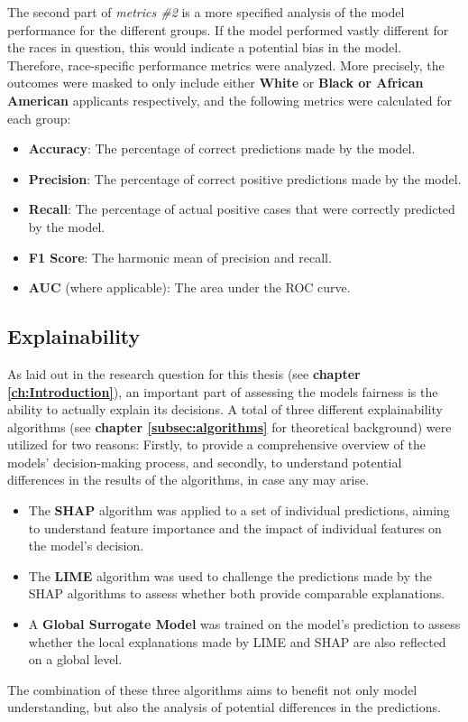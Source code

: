 The second part of \textit{metrics \#2} is a more specified analysis of the model performance for the different groups. If the model performed vastly different for the races in question, this would indicate a potential bias in the model. Therefore, race-specific performance metrics were analyzed.
More precisely, the outcomes were masked to only include either \textbf{White} or \textbf{Black or African American} applicants respectively, and the following metrics were calculated for each group:
\begin{itemize}
    \item \textbf{Accuracy}: The percentage of correct predictions made by the model.
    \item \textbf{Precision}: The percentage of correct positive predictions made by the model.
    \item \textbf{Recall}: The percentage of actual positive cases that were correctly predicted by the model.
    \item \textbf{F1 Score}: The harmonic mean of precision and recall.
    \item \textbf{AUC} (where applicable): The area under the ROC curve.
\end{itemize}

\subsection{Explainability}\label{subsec:Explainability}

As laid out in the research question for this thesis (see \textbf{chapter \ref{ch:Introduction}}), an important part of assessing the models fairness is the ability to actually explain its decisions.
A total of three different explainability algorithms (see \textbf{chapter \ref{subsec:algorithms}} for theoretical background) were utilized for two reasons: Firstly, to provide a comprehensive overview of the models' decision-making process, and secondly, to understand potential differences in the results of the algorithms, in case any may arise.
\begin{itemize}
    \item The \textbf{SHAP} algorithm was applied to a set of individual predictions, aiming to understand feature importance and the impact of individual features on the model's decision.
    \item The \textbf{LIME} algorithm was used to challenge the predictions made by the SHAP algorithms to assess whether both provide comparable explanations.
    \item A \textbf{Global Surrogate Model} was trained on the model's prediction to assess whether the local explanations made by LIME and SHAP are also reflected on a global level.
\end{itemize}
The combination of these three algorithms aims to benefit not only model understanding, but also the analysis of potential differences in the predictions.

